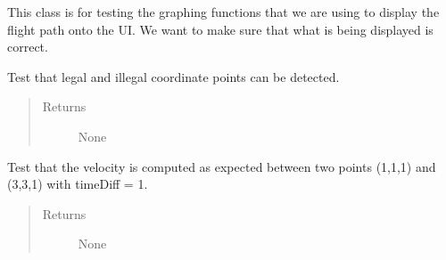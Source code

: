 \documentclass[letterpaper,10pt,english]{sphinxmanual}
\begin{document}
\begin{fulllineitems}
\label{\detokenize{index:src.Tests.Graph_Test.Graph_Test}}
This class is for testing the graphing functions that we are using to display the flight path
onto the UI. We want to make sure that what is being displayed is correct.

\begin{fulllineitems}
\label{\detokenize{index:src.Tests.Graph_Test.Graph_Test.test_checkLegalInput}}
Test that legal and illegal coordinate points can be detected.
\begin{quote}\begin{description}
\item[{Returns}] \leavevmode
None

\end{description}\end{quote}

\end{fulllineitems}


\begin{fulllineitems}
\label{\detokenize{index:src.Tests.Graph_Test.Graph_Test.test_computeVelocity}}
Test that the velocity is computed as expected between two points (1,1,1) and (3,3,1) with timeDiff = 1.
\begin{quote}\begin{description}
\item[{Returns}] \leavevmode
None

\end{description}\end{quote}

\end{fulllineitems}



\end{fulllineitems}
\end{document}
